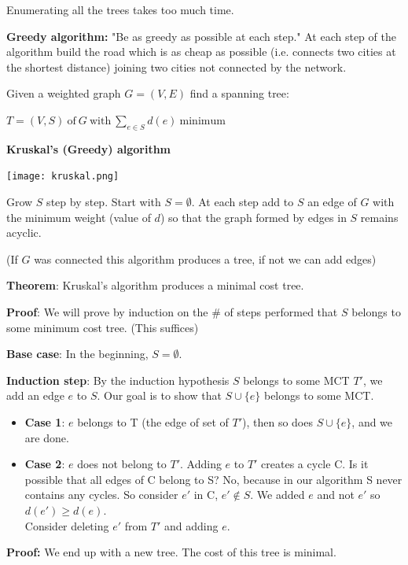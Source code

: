 \documentclass[9pt, letterpaper, oneside]{article}
\begin{document}
Enumerating all the trees takes too much time.

\textbf{Greedy algorithm:} "Be as greedy as possible at each step." At each step of the algorithm build the road which is as cheap as possible (i.e. connects two cities at the shortest distance) joining two cities not connected by the network.


Given a weighted graph $G = (V, E)$ find a spanning tree:

$T = (V, S) \ \mathrm{of} \ G \ \mathrm{with} \ \sum_{e \in S} d(e) \ \text{minimum}$

\textbf{Kruskal's (Greedy) algorithm}

\texttt{[image: kruskal.png]}

Grow $S$ step by step. Start with $S = \emptyset$. At each step add to $S$ an edge of $G$ with the minimum weight (value of $d$) so that the graph formed by edges in $S$ remains acyclic.

(If $G$ was connected this algorithm produces a tree, if not we can add edges)

\textbf{Theorem}: Kruskal's algorithm produces a minimal cost tree.

\textbf{Proof}: We will prove by induction on the $\#$ of steps performed that $S$ belongs to some minimum cost tree. (This suffices)

\textbf{Base case}: In the beginning, $S = \emptyset$.

\textbf{Induction step}: By the induction hypothesis $S$ belongs to some MCT $T'$, we add an edge $e$ to $S$. Our goal is to show that $S \cup \{e\}$ belongs to some MCT.

\begin{itemize}
\item \textbf{Case 1}: $e$ belongs to T (the edge of set of $T'$), then so does $S \cup \{e\}$, and we are done.
\item \textbf{Case 2}: $e$ does not belong to $T'$. Adding $e$ to $T'$ creates a cycle C. Is it possible that all edges of C belong to S? No, because in our algorithm S never contains any cycles. 
So consider $e'$ in C, $e' \notin S$. We added $e$ and not $e'$  so $d(e') \geq d(e)$.\\
Consider deleting $e'$ from $T'$ and adding $e$.
\end{itemize}
\textbf{Proof:} We end up with a new tree. The cost of this tree is  minimal.
\end{document}
